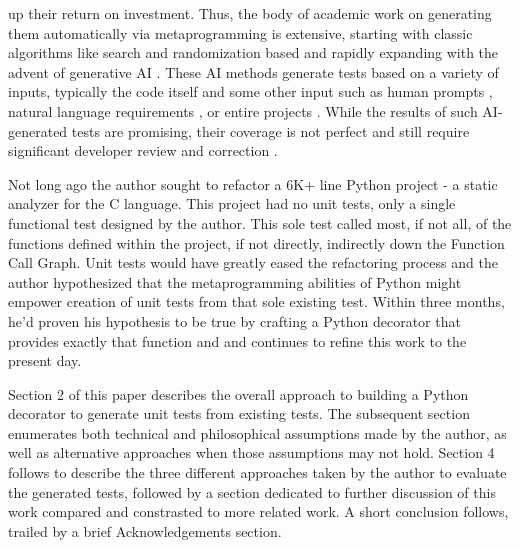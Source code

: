 up their return on investment. Thus, the body of academic work on generating them automatically 
via metaprogramming is extensive, starting with classic algorithms like search 
and randomization based \cite{Luk22Pynguin0170} and rapidly expanding 
with the advent of generative AI 
\cite{bhatia2023unit,takerngsaksiri2024tdd,wang2024software, kahur2023java}.
%
These AI methods generate tests based on a variety of inputs, typically the code
itself and some other input such as human prompts 
\cite{lahiri2023interactivecodegenerationtestdriven},
natural language requirements \cite{wang2024software}, or entire projects
\cite{rao2023cat}.  While the results of such AI-generated tests are promising,
their coverage is not perfect \cite{kahur2023java} and still require significant
developer review and correction \cite{sundqvist2024ai}.

Not long ago the author sought to refactor a 6K+ line Python project - a static
analyzer for the C language. This project had no unit tests, 
only a single functional test designed by the author.
This sole test called most, if not all, of the functions defined within the 
project, if not directly, indirectly down the Function Call Graph.
Unit tests would have greatly eased the refactoring process and the author 
hypothesized that the metaprogramming abilities of Python might empower creation
of unit tests from that sole existing test. Within three months, he'd proven 
his hypothesis to be true by crafting a Python decorator that provides exactly
that function and and continues to refine this work to the present day.

Section 2 of this paper describes the overall approach to building a
Python decorator to generate unit tests from existing tests. The subsequent
section enumerates both technical and philosophical assumptions made by the
author, as well as alternative approaches when those assumptions may not hold.
Section 4 follows to describe the three different approaches taken by the author to 
evaluate the generated tests, followed by a section dedicated to further 
discussion of this work compared and constrasted to more related work.  A short
conclusion follows, trailed by a brief Acknowledgements section.

